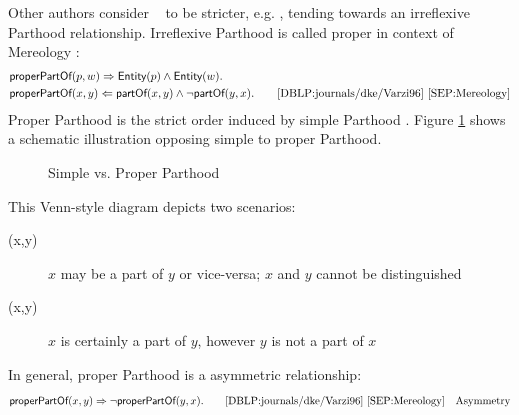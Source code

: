Other authors consider \partOf~ to be stricter, e.g. \cite{DBLP:conf/sle/Lammel16}, tending towards an irreflexive \gls{Parthood} relationship.
Irreflexive \gls{Parthood} is called proper in context of \gls{Mereology} \cite{DBLP:journals/dke/Varzi96} \cite{SEP:Mereology}:
\begin{align*}
&\textsf{properPartOf}(p,w)
\Rightarrow
\textsf{Entity}(p) \wedge \textsf{Entity}(w).\\
&\textsf{properPartOf}(x,y)
\Leftarrow
\textsf{partOf}(x,y) \wedge \neg \textsf{partOf}(y,x).
\qquad\text{\cite{DBLP:journals/dke/Varzi96} \cite{SEP:Mereology}}
\end{align*}
Proper \gls{Parthood} is the strict order induced by simple \gls{Parthood} \cite{DBLP:journals/dke/Varzi96} \cite{SEP:Mereology}.
Figure \ref{figure:SchematicProperPart} shows a schematic illustration opposing simple to proper \gls{Parthood}.
\begin{figure}[h!]
\begin{center}
\end{center}
\caption{Simple vs. Proper Parthood}
\label{figure:SchematicProperPart}
\end{figure}
This Venn-style diagram depicts two scenarios:
\begin{description}
\item[\partOf(x,y)]
$x$ may be a part of $y$ or vice-versa;
$x$ and $y$ cannot be distinguished
\item[\properPartOf(x,y)] 
$x$ is certainly a part of $y$, however $y$ is not a part of $x$
\end{description} 
In general, proper \gls{Parthood} is a asymmetric relationship:
\begin{align*}
&\textsf{properPartOf}(x,y) 
\Rightarrow
\neg \textsf{properPartOf}(y,x).
\qquad\text{\cite{DBLP:journals/dke/Varzi96} \cite{SEP:Mereology}}
&\text{Asymmetry}
\end{align*}


